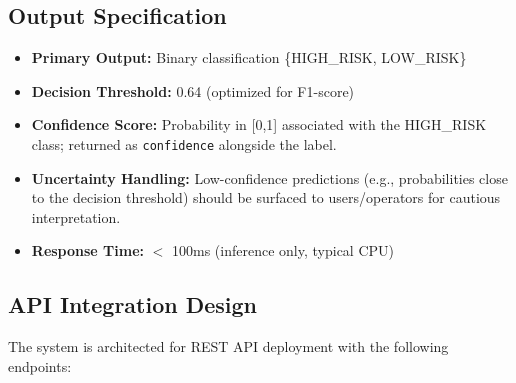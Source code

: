 \documentclass[11pt]{article}
\begin{document}
\subsection{Output Specification}
\begin{itemize}[leftmargin=*]
\item \textbf{Primary Output:} Binary classification \{HIGH\_RISK, LOW\_RISK\}
\item \textbf{Decision Threshold:} 0.64 (optimized for F1-score)
\item \textbf{Confidence Score:} Probability in [0,1] associated with the HIGH\_RISK class; returned as \texttt{confidence} alongside the label.
\item \textbf{Uncertainty Handling:} Low-confidence predictions (e.g., probabilities close to the decision threshold) should be surfaced to users/operators for cautious interpretation.
\item \textbf{Response Time:} $<$ 100ms (inference only, typical CPU)
\end{itemize}

\subsection{API Integration Design}
The system is architected for REST API deployment with the following endpoints:
\end{document}

